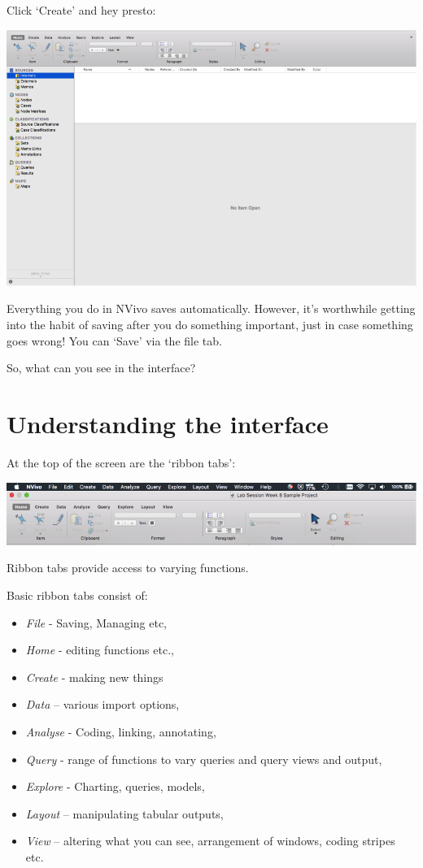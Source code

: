 \documentclass[]{book}
\providecommand{\tightlist}{%
  \setlength{\itemsep}{0pt}\setlength{\parskip}{0pt}}
\theoremstyle{definition}
\theoremstyle{definition}
\theoremstyle{definition}
\theoremstyle{remark}
\begin{document}
Click `Create' and hey presto:

\includegraphics{imgs/qual_07.png}

Everything you do in NVivo saves automatically. However, it's worthwhile
getting into the habit of saving after you do something important, just
in case something goes wrong! You can `Save' via the file tab.

So, what can you see in the interface?

\hypertarget{understanding-the-interface}{%
\section{Understanding the
interface}\label{understanding-the-interface}}

At the top of the screen are the `ribbon tabs':

\includegraphics{imgs/qual_08.png}

Ribbon tabs provide access to varying functions.

Basic ribbon tabs consist of:

\begin{itemize}
\tightlist
\item
  \emph{File} - Saving, Managing etc,
\item
  \emph{Home} - editing functions etc.,
\item
  \emph{Create} - making new things
\item
  \emph{Data} -- various import options,
\item
  \emph{Analyse} - Coding, linking, annotating,
\item
  \emph{Query} - range of functions to vary queries and query views and
  output,
\item
  \emph{Explore} - Charting, queries, models,
\item
  \emph{Layout} -- manipulating tabular outputs,
\item
  \emph{View} -- altering what you can see, arrangement of windows,
  coding stripes etc.
\end{itemize}
\end{document}
